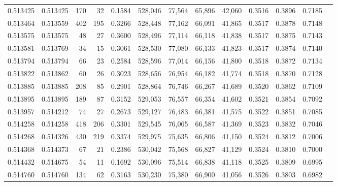 \begin{tabular}{rrrrrrrrrrrrr}
0.513425 & 0.513425 &   170 &    32 &                                     0.1584 & 528,046 &  77,564 &  65,896 &  42,060 & 0.3516 & 0.3896 & 0.7185 \\
0.513464 & 0.513559 &   402 &   195 &                                     0.3266 & 528,448 &  77,162 &  66,091 &  41,865 & 0.3517 & 0.3878 & 0.7148 \\
0.513575 & 0.513575 &    48 &    27 &                                     0.3600 & 528,496 &  77,114 &  66,118 &  41,838 & 0.3517 & 0.3875 & 0.7143 \\
0.513581 & 0.513769 &    34 &    15 &                                     0.3061 & 528,530 &  77,080 &  66,133 &  41,823 & 0.3517 & 0.3874 & 0.7140 \\
0.513794 & 0.513794 &    66 &    23 &                                     0.2584 & 528,596 &  77,014 &  66,156 &  41,800 & 0.3518 & 0.3872 & 0.7134 \\
0.513822 & 0.513862 &    60 &    26 &                                     0.3023 & 528,656 &  76,954 &  66,182 &  41,774 & 0.3518 & 0.3870 & 0.7128 \\
0.513885 & 0.513885 &   208 &    85 &                                     0.2901 & 528,864 &  76,746 &  66,267 &  41,689 & 0.3520 & 0.3862 & 0.7109 \\
0.513895 & 0.513895 &   189 &    87 &                                     0.3152 & 529,053 &  76,557 &  66,354 &  41,602 & 0.3521 & 0.3854 & 0.7092 \\
0.513957 & 0.514212 &    74 &    27 &                                     0.2673 & 529,127 &  76,483 &  66,381 &  41,575 & 0.3522 & 0.3851 & 0.7085 \\
0.514258 & 0.514258 &   418 &   206 &                                     0.3301 & 529,545 &  76,065 &  66,587 &  41,369 & 0.3523 & 0.3832 & 0.7046 \\
0.514268 & 0.514326 &   430 &   219 &                                     0.3374 & 529,975 &  75,635 &  66,806 &  41,150 & 0.3524 & 0.3812 & 0.7006 \\
0.514368 & 0.514373 &    67 &    21 &                                     0.2386 & 530,042 &  75,568 &  66,827 &  41,129 & 0.3524 & 0.3810 & 0.7000 \\
0.514432 & 0.514675 &    54 &    11 &                                     0.1692 & 530,096 &  75,514 &  66,838 &  41,118 & 0.3525 & 0.3809 & 0.6995 \\
0.514760 & 0.514760 &   134 &    62 &                                     0.3163 & 530,230 &  75,380 &  66,900 &  41,056 & 0.3526 & 0.3803 & 0.6982 \\

\end{tabular}
